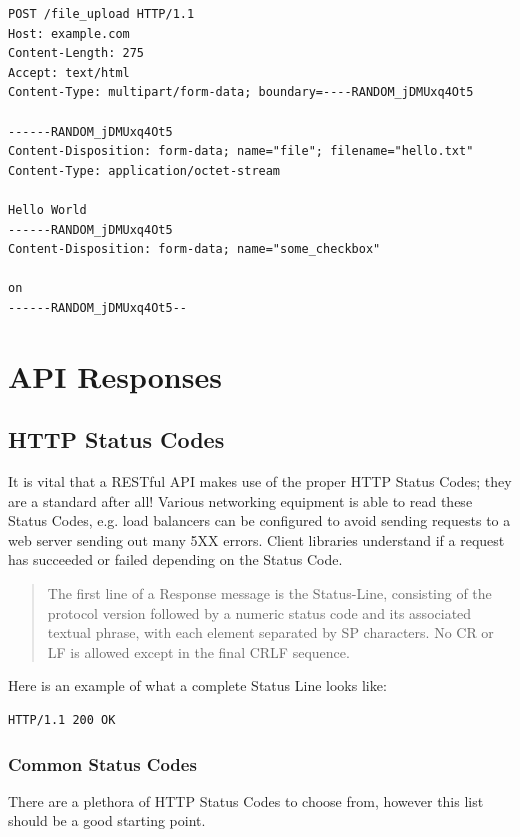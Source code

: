 \documentclass{book}
\begin{document}
\begin{verbatim}
POST /file_upload HTTP/1.1
Host: example.com
Content-Length: 275
Accept: text/html
Content-Type: multipart/form-data; boundary=----RANDOM_jDMUxq4Ot5

------RANDOM_jDMUxq4Ot5
Content-Disposition: form-data; name="file"; filename="hello.txt"
Content-Type: application/octet-stream

Hello World
------RANDOM_jDMUxq4Ot5
Content-Disposition: form-data; name="some_checkbox"

on
------RANDOM_jDMUxq4Ot5--
\end{verbatim}


\chapter{API Responses}

\section{HTTP Status Codes}

It is vital that a RESTful API makes use of the proper HTTP Status Codes; they are a standard after all! Various networking equipment is able to read these Status Codes, e.g. load balancers can be configured to avoid sending requests to a web server sending out many 5XX errors. Client libraries understand if a request has succeeded or failed depending on the Status Code.

\begin{quote}
The first line of a Response message is the Status-Line, consisting of the protocol version followed by a numeric status code and its associated textual phrase, with each element separated by SP characters. No CR or LF is allowed except in the final CRLF sequence.\cite{RFC2616}
\end{quote}

Here is an example of what a complete Status Line looks like:

\begin{verbatim}
HTTP/1.1 200 OK
\end{verbatim}

\subsection{Common Status Codes}

There are a plethora of HTTP Status Codes \cite{RFC2616} to choose from, however this list should be a good starting point.
\end{document}
